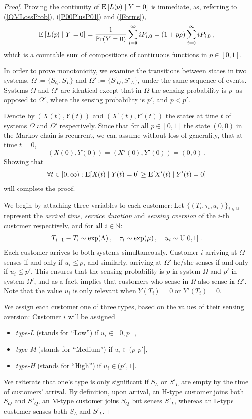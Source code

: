 \documentclass[11pt]{article}
\numberwithin{equation}{section}
\newcommand{\e}{{\rm E}}
\newcommand{\expdist}{{\rm exp}}
\newcommand{\U}{{\rm U}}
\begin{document}
\begin{proof}
Proving the continuity of $\e\left[L(p)\mid Y=0\right]$ is immediate, as, referring to (\ref{OMLossProb}), (\ref{P00PlusP01}) and (\ref{Forms}),
\[ \e\left[L(p)\mid Y=0\right] = \frac{1}{\Pr(Y=0)}\sum\limits_{i=0}^{\infty} i P_{i, 0} = (1+p\rho) \sum\limits_{i=0}^{\infty} i P_{i, 0} \:,\]
which is a countable sum of compositions of continuous functions in $p \in [0,1]$. 

In order to prove monotonicity, we examine the transitions between states in two systems, $\Omega := \lbrace S_Q, S_L \rbrace$ and $\Omega' := \lbrace S'_Q, S'_L \rbrace$, under the same sequence of events. Systems $\Omega$ and $\Omega'$ are identical except that in $\Omega$ the sensing probability is $p$, as opposed to $\Omega'$, where the sensing probability is $p'$, and $p < p'$. 

Denote by $(X(t),Y(t))$ and $(X'(t),Y'(t))$ the states at time $t$ of systems $\Omega$ and $\Omega'$ respectively. Since that for all $p \in [0,1]$ the state $(0,0)$ in the Markov chain is recurrent, we can assume without loss of generality, that at time $t=0$, 
\[(X(0),Y(0)) = (X'(0),Y'(0)) = (0,0)\:.\] 
Showing that 
\begin{equation}
\forall t \in [0,\infty) : \e[X(t) \mid Y(t) = 0] \geq \e[X'(t) \mid Y'(t) = 0] \label{SuffArg4.1}
\end{equation}
will complete the proof.

We begin by attaching three variables to each customer: Let $\lbrace{ (T_i, \tau_i, u_i) \rbrace}_{i \in \mathbb{N} }$ represent the {\it arrival time}, {\it service duration} and {\it sensing aversion} of the $i$-th customer respectively, and for all $i \in \mathbb{N}$: 
\[T_{i+1} - T_i \sim \expdist(\Lambda) \:, 
\quad \tau_i \sim \expdist(\mu) \:,
\quad u_i \sim \U[0,1] \:.\]
Each customer arrives to both systems simultaneously. Customer $i$ arriving at $\Omega$ senses if and only if $u_i \leq p$, and similarly, arriving at $\Omega'$ he/she senses if and only if $u_i \leq p'$. This ensures that the sensing probability is $p$ in system $\Omega$ and $p'$ in system $\Omega'$, and as a fact, implies that customers who sense in $\Omega$ also sense in $\Omega'$. Note that the value $u_i$ is only relevant when 
$Y(T_i)=0$ or $Y'(T_i)=0$.

We assign each customer one of three types, based on the values of their sensing aversion: Customer $i$ will be assigned
\begin{itemize}
\item {\it type-L} (stands for ``Low'') if $u_i \in [0, p]$,
\item {\it type-M} (stands for ``Medium'') if $u_i \in (p, p']$,
\item {\it type-H} (stands for ``High'') if $u_i \in (p',1]$.
\end{itemize}
We reiterate that one's type is only significant if $S_L$ or $S'_L$ are empty by the time of customers' arrival.
By definition, upon arrival, an H-type customer joins both $S_Q$ and $S'_Q$, an M-type customer joins $S_Q$ but senses $S'_L$, whereas an L-type customer senses both $S_L$ and $S'_L$.


\end{proof}
\end{document}

